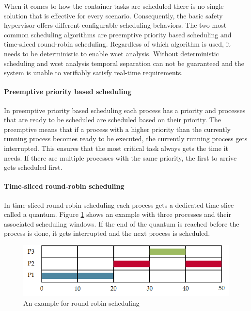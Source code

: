 When it comes to how the container tasks are scheduled there is no single solution that is effective for every scenario. Consequently, the basic safety hypervisor offers different configurable scheduling behaviors. The two most common scheduling algorithms are preemptive priority based scheduling and time-sliced round-robin scheduling. Regardless of which algorithm is used, it needs to be deterministic to enable \acrlong{wcet} analysis. Without deterministic scheduling and \acrshort{wcet} analysis temporal separation can not be guaranteed and the system is unable to verifiably satisfy real-time requirements.

\paragraph{Preemptive priority based scheduling}
In preemptive priority based scheduling each process has a priority and processes that are ready to be scheduled are scheduled based on their priority.
The preemptive means that if a process with a higher priority than the currently running process becomes ready to be executed, the currently running process gets interrupted. This ensures that the most critical task always gets the time it needs. If there are multiple processes with the same priority, the first to arrive gets scheduled first.

\paragraph{Time-sliced round-robin scheduling}
In time-sliced round-robin scheduling each process gets a dedicated time slice called a quantum. Figure \ref{fig:round_robin_example}  shows an example with three processes and their associated scheduling windows. If the end of the quantum is reached before the process is done, it gets interrupted and the next process is scheduled.
\begin{figure}
\centering
\includegraphics[scale=0.75]{Figures/round_robin_example.png}
\decoRule
\caption{An example for round robin scheduling}
\label{fig:round_robin_example}
\end{figure}

